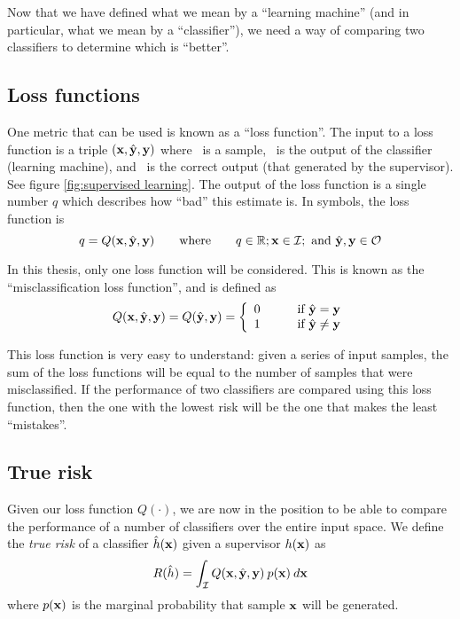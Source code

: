 Now that we have defined what we mean by a ``learning machine'' (and
in particular, what we mean by a ``classifier''), we need a way of
comparing two classifiers to determine which is ``better''.


\subsection{Loss functions}

One metric that can be used is known as a ``loss function''.  The
input to a loss function is a triple $(\mathbf{x}, \hat{\mathbf{y}}, \mathbf{y})$ where \bfx\
is a sample, \bfyh\ is the output of the classifier (learning
machine), and \bfy\ is the correct output (that generated by the
supervisor).  See figure \ref{fig:supervised learning}.  The output of
the loss function is a single number $q$ which describes how ``bad''
this estimate is.  In symbols, the loss function is
%
\begin{equation}
q = Q(\mathbf{x}, \hat{\mathbf{y}}, \mathbf{y}) \qquad \mbox{where} \qquad q \in \mathbb{R};
\mathbf{x} \in \mathcal{I}; \mbox{ and }\hat{\mathbf{y}}, \mathbf{y} \in \mathcal{O}
\end{equation}

In this thesis, only one loss function will be considered.  This is
known as the ``misclassification loss function'', and is defined as
%
\begin{equation}
Q(\mathbf{x}, \hat{\mathbf{y}}, \mathbf{y}) = Q(\hat{\mathbf{y}}, \mathbf{y}) = \left\{
\begin{array}{ll}
	0	&	\qquad \mbox{if $\hat{\mathbf{y}} = \mathbf{y}$} \\
	1	&	\qquad \mbox{if $\hat{\mathbf{y}} \neq \mathbf{y}$}
\end{array}
\right.
\label{eqn:misclassification loss function}
\end{equation}

This loss function is very easy to understand: given a series of input
samples, the sum of the loss functions will be equal to the number of
samples that were misclassified.  If the performance of two
classifiers are compared using this loss function, then the one with
the lowest risk will be the one that makes the least ``mistakes''.


\subsection{True risk}
\label{sec:true risk}
Given our loss function $Q(\cdot)$, we are now in the position to be
able to compare the performance of a number of classifiers over the
entire input space.  We define the \emph{true risk} of a classifier
$\hat{h}(\mathbf{x})$ given a supervisor $h(\mathbf{x})$ as
%
\begin{equation}
R(\hat{h}) = \int_{\mathcal{I}} Q(\mathbf{x}, \hat{\mathbf{y}}, \mathbf{y}) \: p(\mathbf{x}) \: d\mathbf{x}
\label{eqn:true risk}
\end{equation}
%
where $p(\mathbf{x})$ is the marginal probability that sample $\mathbf{x}$ will be
generated.

